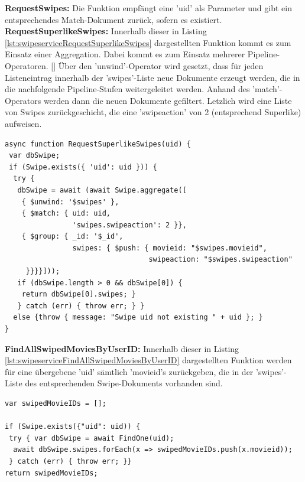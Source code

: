 \noindent
\textbf{RequestSwipes:}
Die Funktion empfängt eine 'uid' als Parameter und gibt ein entsprechendes Match-Dokument zurück, sofern es existiert.\\

\noindent
\textbf{RequestSuperlikeSwipes:}
Innerhalb dieser in Listing \ref{lst:swipeserviceRequestSuperlikeSwipes} dargestellten Funktion kommt es zum Einsatz einer Aggregation. 
Dabei kommt es zum Einsatz mehrerer Pipeline-Operatoren. []
Über den 'unwind'-Operator wird gesetzt, dass für jeden Listeneintrag innerhalb der 'swipes'-Liste neue Dokumente erzeugt werden, die in die nachfolgende Pipeline-Stufen weitergeleitet werden. Anhand des 'match'-Operators werden dann die neuen Dokumente gefiltert. Letzlich wird eine Liste von Swipes zurückgeschicht, die eine 'swipeaction' von 2 (entsprechend Superlike) aufweisen.

\begin{lstlisting}[caption=Swipe Service - RequestSuperlikeSwipes, label=lst:swipeserviceRequestSuperlikeSwipes]
async function RequestSuperlikeSwipes(uid) {
 var dbSwipe;
 if (Swipe.exists({ 'uid': uid })) {
  try {
   dbSwipe = await (await Swipe.aggregate([
    { $unwind: '$swipes' },
    { $match: { uid: uid,
                'swipes.swipeaction': 2 }},
    { $group: { _id: '$_id',
                swipes: { $push: { movieid: "$swipes.movieid",
                                  swipeaction: "$swipes.swipeaction" 
     }}}}]));
   if (dbSwipe.length > 0 && dbSwipe[0]) {
    return dbSwipe[0].swipes; }
   } catch (err) { throw err; } }
  else {throw { message: "Swipe uid not existing " + uid }; }
}
\end{lstlisting}

\noindent
\textbf{FindAllSwipedMoviesByUserID:}
Innerhalb dieser in Listing \ref{lst:swipeserviceFindAllSwipedMoviesByUserID} dargestellten Funktion werden für eine übergebene 'uid' sämtlich 'movieid's zurückgeben, die in der 'swipes'-Liste des entsprechenden Swipe-Dokuments vorhanden sind.

\begin{lstlisting}[caption=Swipe Service - FindAllSwipedMoviesByUserID, label=lst:swipeserviceFindAllSwipedMoviesByUserID]
var swipedMovieIDs = [];
    
if (Swipe.exists({"uid": uid)) {
 try { var dbSwipe = await FindOne(uid);
  await dbSwipe.swipes.forEach(x => swipedMovieIDs.push(x.movieid));
 } catch (err) { throw err; }}
return swipedMovieIDs;
\end{lstlisting}


